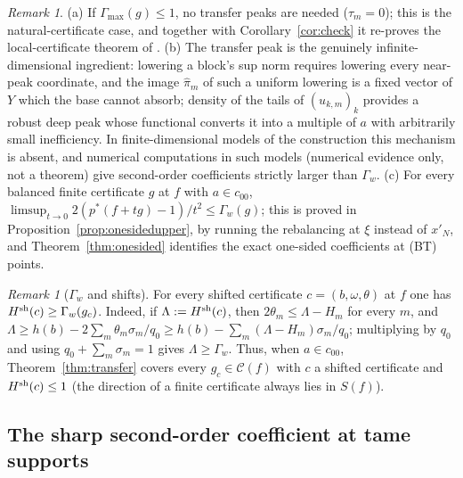 \documentclass[10pt]{amsart}
\theoremstyle{definition}
\theoremstyle{remark}
\newtheorem{remark}[theorem]{Remark}
\newcommand{\Cset}{\mathcal C}
\begin{document}
\begin{remark}\label{rem:transfer}
(a) If $\Gamma_{\max}(g)\le1$, no transfer peaks are needed ($\tau_m=0$);
this is the natural-certificate case, and together with
Corollary~\ref{cor:check} it re-proves the local-certificate theorem of
\cite{Check}.  (b) The transfer peak is the genuinely infinite-dimensional
ingredient: lowering a block's sup norm requires lowering every near-peak
coordinate, and the image $\hat\pi_m$ of such a uniform lowering is a fixed
vector of $Y$ which the base cannot absorb; density of the tails of
$(u_{k,m})_k$ provides a robust deep peak whose functional converts it into
a multiple of $a$ with arbitrarily small inefficiency.  In finite-dimensional
models of the construction this mechanism is absent, and numerical
computations in such models (numerical evidence only, not a theorem) give
second-order coefficients strictly larger than $\Gamma_w$.
(c) For every balanced finite certificate $g$ at $f$ with $a\in c_{00}$,
$\limsup_{t\to0}2(p^*(f+tg)-1)/t^2\le\Gamma_w(g)$; this is proved in
Proposition~\ref{prop:onesidedupper}, by running the rebalancing at $\xi$
instead of $x'_N$, and Theorem~\ref{thm:onesided} identifies the exact
one-sided coefficients at \textup{(BT)} points.
\end{remark}

\begin{remark}[$\Gamma_w$ and shifts]\label{rem:gammaw}
For every shifted certificate $c=(b,\omega,\theta)$ at $f$ one has
$H^{\rm sh}(c)\ge\Gamma_w(g_c)$.  Indeed, if $\Lambda:=H^{\rm sh}(c)$, then
$2\theta_m\le\Lambda-H_m$ for every $m$, and
$\Lambda\ge h(b)-2\sum_m\theta_m\sigma_m/q_0\ge h(b)-\sum_m(\Lambda-H_m)
\sigma_m/q_0$; multiplying by $q_0$ and using $q_0+\sum_m\sigma_m=1$ gives
$\Lambda\ge\Gamma_w$.  Thus, when $a\in c_{00}$, Theorem~\ref{thm:transfer}
covers every $g_c\in\Cset(f)$ with $c$ a shifted certificate and
$H^{\rm sh}(c)\le1$ (the direction of a finite certificate always lies in
$S(f)$).
\end{remark}

\subsection{The sharp second-order coefficient at tame supports}
\end{document}

